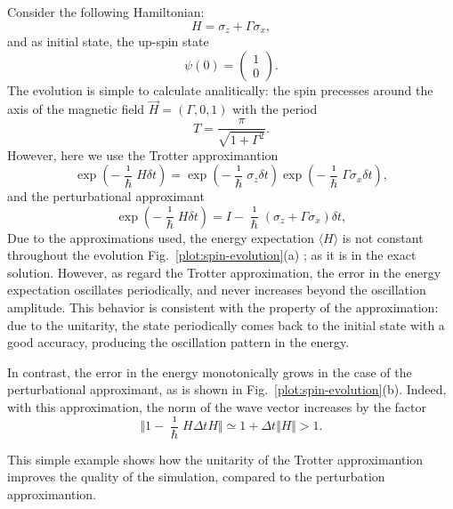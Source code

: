 Consider the following Hamiltonian:
\begin{equation}
H = \sigma_z + \Gamma \sigma_x,
\end{equation}
and as initial state, the up-spin state
\begin{equation}
\psi(0) = 
\begin{pmatrix}
1 \\ 0
\end{pmatrix}.
\end{equation}
The evolution is simple to calculate analitically: the spin precesses around the axis of the magnetic field $\vec{H} = (\Gamma, 0, 1)$ with the period
\begin{equation}
T = \frac{\pi}{\sqrt{1+\Gamma^2}}.
\end{equation}
However, here we use the Trotter approximantion
\begin{equation} \label{eq:trotter-approximant}
\exp\left({-\frac{\imath}{\hbar}H \delta t}\right) = \exp\left({-\frac{\imath}{\hbar} \sigma_z \delta t}\right) \exp\left({-\frac{\imath}{\hbar} \Gamma \sigma_x \delta t}\right),
\end{equation}
and the perturbational approximant
\begin{equation} \label{eq:perturbational-approximant}
\exp\left({-\frac{\imath}{\hbar}H \delta t}\right) = I - \frac{\imath}{\hbar}(\sigma_z + \Gamma\sigma_x) \delta t,
\end{equation}
Due to the approximations used, the energy expectation $\langle H \rangle$ is not constant throughout the evolution Fig.~\ref{plot:spin-evolution}(a) ; as it is in the exact solution. However, as regard the Trotter approximation, the error in the energy expectation oscillates periodically, and never increases beyond the oscillation amplitude. This behavior is consistent with the property of the approximation: due to the unitarity, the state periodically comes back to the initial state with a good accuracy, producing the oscillation pattern in the energy.


In contrast, the error in the energy monotonically grows in the case of the perturbational approximant, as is shown in Fig.~\ref{plot:spin-evolution}(b). Indeed, with this approximation, the norm of the wave vector increases by the factor
\begin{equation}
\Vert 1 - \frac{\imath}{\hbar} H \Delta t H \Vert \simeq 1 + \Delta t \Vert H \Vert > 1.
\end{equation}

This simple example shows how the unitarity of the Trotter approximantion improves the quality of the simulation, compared to the perturbation approximantion.

